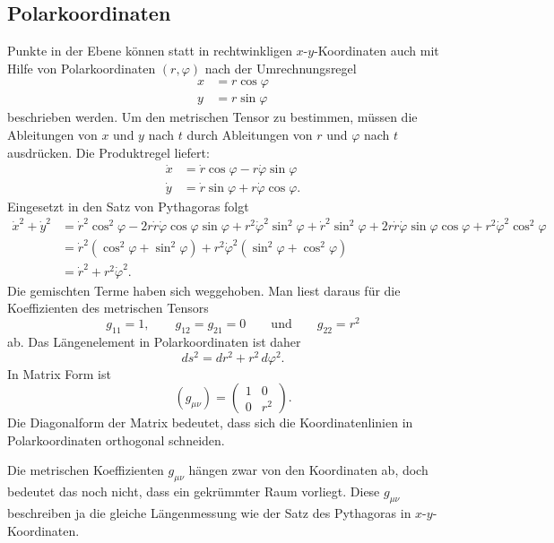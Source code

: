 \subsection{Polarkoordinaten}
Punkte in der Ebene können statt in rechtwinkligen $x$-$y$-Koordinaten
auch mit Hilfe von Polarkoordinaten $(r,\varphi)$ nach der Umrechnungsregel
\begin{align*}
x&=r\cos\varphi\\
y&=r\sin\varphi
\end{align*}
beschrieben werden.
Um den metrischen Tensor zu bestimmen, müssen die Ableitungen von $x$ 
und $y$ nach $t$ durch Ableitungen von $r$ und $\varphi$ nach $t$ 
ausdrücken.
Die Produktregel liefert:
\begin{align*}
\dot x&= \dot r\cos \varphi - r\dot\varphi \sin\varphi 
\\
\dot y&= \dot r\sin\varphi + r\dot\varphi\cos\varphi.
\end{align*}
Eingesetzt in den Satz von Pythagoras folgt
\begin{align*}
\dot x^2 + \dot y^2
&=
\dot r^2\cos^2\varphi -2r\dot r\dot\varphi\cos\varphi\sin\varphi +r^2\dot \varphi^2\sin^2\varphi
+
\dot r^2\sin^2\varphi +2r\dot r\dot\varphi\sin\varphi\cos\varphi +r^2\dot\varphi^2\cos^2\varphi
\\
&=
\dot r^2(\cos^2\varphi+\sin^2\varphi)+ r^2\dot\varphi^2(\sin^2\varphi+\cos^2\varphi)
\\
&=\dot r^2 + r^2\dot\varphi^2.
\end{align*}
Die gemischten Terme haben sich weggehoben.
Man liest daraus für die Koeffizienten des metrischen Tensors
\[
g_{11}=1,\qquad g_{12}=g_{21}=0\qquad\text{und}\qquad g_{22}=r^2
\]
ab.
Das Längenelement in Polarkoordinaten ist daher
\[
ds^2
=
dr^2 + r^2\,d\varphi^2.
\]
%
In Matrix Form ist
\[
(g_{\mu\nu})
=
\begin{pmatrix}
1&0\\0&r^2
\end{pmatrix}.
\]
Die Diagonalform der Matrix bedeutet, dass sich die Koordinatenlinien
in Polarkoordinaten orthogonal schneiden.

Die metrischen Koeffizienten $g_{\mu\nu}$ hängen zwar von den Koordinaten ab,
doch bedeutet das noch nicht, dass ein gekrümmter Raum vorliegt.
Diese $g_{\mu\nu}$ beschreiben ja die gleiche Längenmessung wie der Satz
des Pythagoras in $x$-$y$-Koordinaten.

